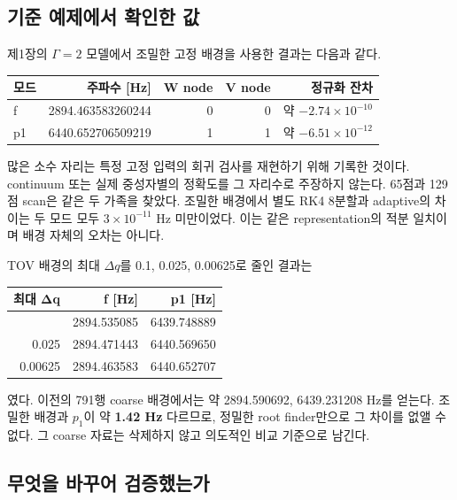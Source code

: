 \documentclass[
  10pt,
  a4paper,
]{article}
\begin{document}
\subsection{기준 예제에서 확인한
값}\label{uxae30uxc900-uxc608uxc81cuxc5d0uxc11c-uxd655uxc778uxd55c-uxac12}

제1장의 \(\Gamma=2\) 모델에서 조밀한 고정 배경을 사용한 결과는 다음과
같다.

\begin{longtable}[]{@{}lrrrr@{}}
\toprule\noalign{}
모드 & 주파수 {[}Hz{]} & W node & V node & 정규화 잔차 \\
\midrule\noalign{}
\endhead
\bottomrule\noalign{}
\endlastfoot
f & 2894.463583260244 & 0 & 0 & 약 \(-2.74\times10^{-10}\) \\
p1 & 6440.652706509219 & 1 & 1 & 약 \(-6.51\times10^{-12}\) \\
\end{longtable}

많은 소수 자리는 특정 고정 입력의 회귀 검사를 재현하기 위해 기록한
것이다. continuum 또는 실제 중성자별의 정확도를 그 자리수로 주장하지
않는다. 65점과 129점 scan은 같은 두 가족을 찾았다. 조밀한 배경에서 별도
RK4 8분할과 adaptive의 차이는 두 모드 모두 \(3\times10^{-11}\) Hz
미만이었다. 이는 같은 representation의 적분 일치이며 배경 자체의 오차는
아니다.

TOV 배경의 최대 \(\Delta q\)를 0.1, 0.025, 0.00625로 줄인 결과는

\begin{longtable}[]{@{}rrr@{}}
\toprule\noalign{}
최대 Δq & f {[}Hz{]} & p1 {[}Hz{]} \\
\midrule\noalign{}
\endhead
\bottomrule\noalign{}
\endlastfoot
0.1 & 2894.535085 & 6439.748889 \\
0.025 & 2894.471443 & 6440.569650 \\
0.00625 & 2894.463583 & 6440.652707 \\
\end{longtable}

였다. 이전의 791행 coarse 배경에서는 약 2894.590692, 6439.231208 Hz를
얻는다. 조밀한 배경과 \(p_1\)이 약 \textbf{1.42 Hz} 다르므로, 정밀한
root finder만으로 그 차이를 없앨 수 없다. 그 coarse 자료는 삭제하지 않고
의도적인 비교 기준으로 남긴다.

\subsection{무엇을 바꾸어
검증했는가}\label{uxbb34uxc5c7uxc744-uxbc14uxafb8uxc5b4-uxac80uxc99duxd588uxb294uxac00}
\end{document}

